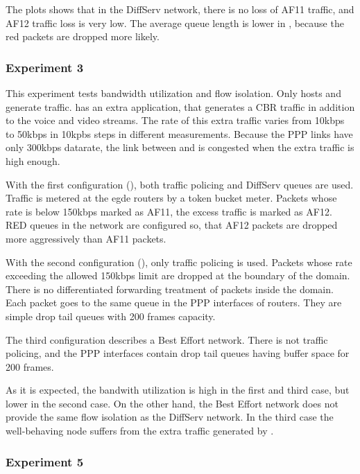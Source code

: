 The plots shows that in the DiffServ network, there is no loss of
AF11 traffic, and AF12 traffic loss is very low. The average queue
length is lower in , because the red packets are dropped
more likely.

\subsubsection*{Experiment 3}

This experiment tests bandwidth utilization and flow isolation.
Only hosts  and  generate traffic.  has
an extra  application, that generates a CBR
traffic in addition to the voice and video streams. The rate of
this extra traffic varies from 10kbps to 50kbps in 10kpbs steps
in different measurements. Because the PPP links have only
300kbps datarate, the link between  and  is
congested when the extra traffic is high enough.

With the first configuration (), both traffic policing
and DiffServ queues are used. Traffic is metered at the egde routers
by a token bucket meter. Packets whose rate is below 150kbps
marked as AF11, the excess traffic is marked as AF12. RED queues
in the network are configured so, that AF12 packets are dropped
more aggressively than AF11 packets.

With the second configuration (), only traffic policing
is used. Packets whose rate exceeding the allowed 150kbps limit
are dropped at the boundary of the domain. There is no differentiated
forwarding treatment of packets inside the domain. Each packet goes
to the same queue in the PPP interfaces of routers. They are simple
drop tail queues with 200 frames capacity.

The third configuration describes a Best Effort network.
There is not traffic policing, and the PPP interfaces contain
drop tail queues having buffer space for 200 frames.

As it is expected, the bandwith utilization is high in the first
and third case, but lower in the second case. On the other hand,
the Best Effort network does not provide the same flow isolation
as the DiffServ network. In the third case the well-behaving
 node suffers from the extra traffic generated by .

\subsubsection*{Experiment 5}

